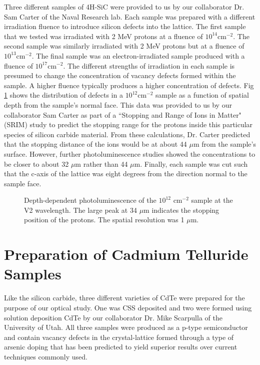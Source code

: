 \documentclass[oneside, astronomy, noacknowlegments]{BYUPhys}
\begin{document}
Three different samples of 4H-SiC were provided to us by our collaborator Dr. Sam Carter of the Naval Research lab. Each sample was prepared with a different irradiation fluence to introduce silicon defects into the lattice. The first sample that we tested was irradiated with 2 MeV protons at a fluence of $10^{14} \text{cm}^{-2}$. The second sample was similarly irradiated with 2 MeV protons but at a fluence of $10^{13} \text{cm}^{-2}$. The final sample was an electron-irradiated sample produced with a fluence of $10^{17} \text{cm}^{-2}$. The different strengths of irradiation in each sample is presumed to change the concentration of vacancy defects formed within the sample. A higher fluence typically produces a higher concentration of defects. Fig \ref{fig:SiCDepth} shows the distribution of defects in a $10^{12} \text{cm}^{-2}$ sample as a function of spatial depth from the sample's normal face. This data was provided to us by our collaborator Sam Carter as part of a ``Stopping and Range of Ions in Matter" (SRIM) study to predict the stopping range for the protons inside this particular species of silicon carbide material. From these calculations, Dr. Carter predicted that the stopping distance of the ions would be at about 44 $\mu$m from the sample's surface. However, further photoluminescence studies showed the concentrations to be closer to about 32 $\mu$m rather than 44 $\mu$m. Finally, each sample was cut such that the c-axis of the lattice was eight degrees from the direction normal to the sample face.

\begin{figure}
    \caption[SiC Depth-Dependent Photoluminescence]{\label{fig:SiCDepth}
     Depth-dependent photoluminescence of the $10^{12}$ $\text{cm}^{−2}$ sample at the V2 wavelength. The large peak at 34 $\mu$m indicates the stopping position of the protons. The spatial resolution was 1 $\mu$m.}
 \end{figure}

\section{Preparation of Cadmium Telluride Samples}

Like the silicon carbide, three different varieties of CdTe were prepared for the purpose of our optical study. One was CSS deposited and two were formed using solution deposition CdTe by our collaborator Dr. Mike Scarpulla of the University of Utah. All three samples were produced as a p-type semiconductor and contain vacancy defects in the crystal-lattice formed through a type of arsenic doping that has been predicted to yield superior results over current techniques commonly used.  
\end{document}
